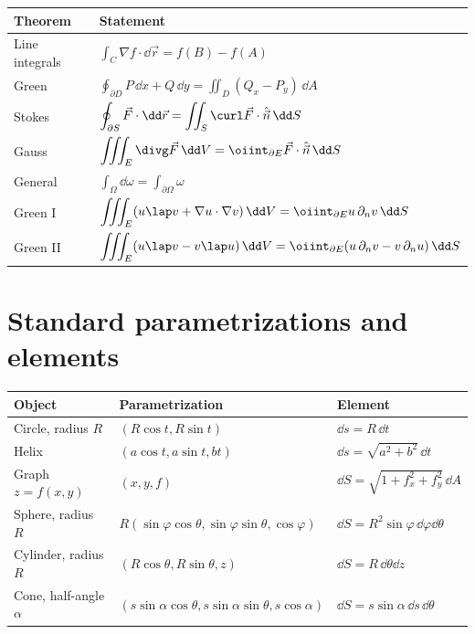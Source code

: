 \begin{center}
\renewcommand{\arraystretch}{1.6}
\begin{tabular}{ll}
\toprule
\textbf{Theorem} & \textbf{Statement} \\
\midrule
Line integrals & $\displaystyle\int_C\nabla f\cdot\dd\vec r=f(B)-f(A)$ \\
Green & $\displaystyle\oint_{\partial D}P\,\dd x+Q\,\dd y=\iint_D(Q_x-P_y)\,\dd A$ \\
Stokes & $\displaystyle\oint_{\partial S}\vec F\cdot\dd\vec r=\iint_S\curl\vec F\cdot\hat{\vec n}\,\dd S$ \\
Gauss & $\displaystyle\iiint_E\divg\vec F\,\dd V=\oiint_{\partial E}\vec F\cdot\hat{\vec n}\,\dd S$ \\
General & $\displaystyle\int_\Omega\dd\omega=\int_{\partial\Omega}\omega$ \\
Green I & $\displaystyle\iiint_E(u\lap v+\nabla u\cdot\nabla v)\,\dd V=\oiint_{\partial E}u\,\partial_nv\,\dd S$ \\
Green II & $\displaystyle\iiint_E(u\lap v-v\lap u)\,\dd V=\oiint_{\partial E}(u\,\partial_nv-v\,\partial_nu)\,\dd S$ \\
\bottomrule
\end{tabular}
\end{center}

\section{Standard parametrizations and elements}

\begin{center}
\renewcommand{\arraystretch}{1.5}
\begin{tabular}{lll}
\toprule
\textbf{Object} & \textbf{Parametrization} & \textbf{Element} \\
\midrule
Circle, radius $R$ & $(R\cos t,R\sin t)$ & $\dd s=R\,\dd t$ \\
Helix & $(a\cos t,a\sin t,bt)$ & $\dd s=\sqrt{a^2+b^2}\,\dd t$ \\
Graph $z=f(x,y)$ & $(x,y,f)$ & $\dd S=\sqrt{1+f_x^2+f_y^2}\,\dd A$ \\
Sphere, radius $R$ & $R(\sin\varphi\cos\theta,\sin\varphi\sin\theta,\cos\varphi)$ & $\dd S=R^2\sin\varphi\,\dd\varphi\dd\theta$ \\
Cylinder, radius $R$ & $(R\cos\theta,R\sin\theta,z)$ & $\dd S=R\,\dd\theta\dd z$ \\
Cone, half-angle $\alpha$ & $(s\sin\alpha\cos\theta,s\sin\alpha\sin\theta,s\cos\alpha)$ & $\dd S=s\sin\alpha\,\dd s\,\dd\theta$ \\
\bottomrule
\end{tabular}
\end{center}

